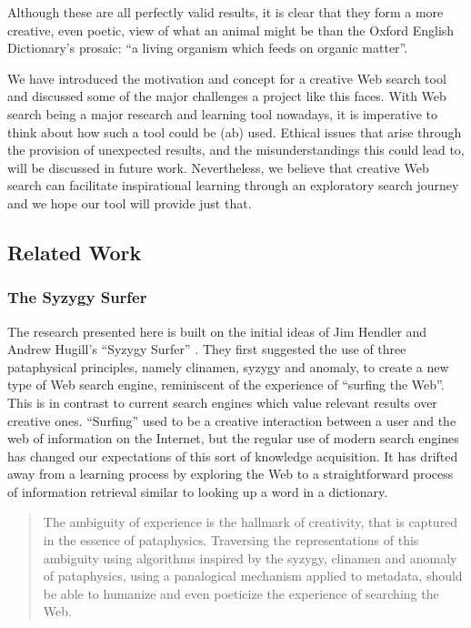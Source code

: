 Although these are all perfectly valid results, it is clear that they form a more creative, even poetic, view of what an animal might be than the Oxford English Dictionary's prosaic: ``a living organism which feeds on organic matter''.

We have introduced the motivation and concept for a creative Web search tool and discussed some of the major challenges a project like this faces. With Web search being a major research and learning tool nowadays, it is imperative to think about how such a tool could be (ab) used. Ethical issues that arise through the provision of unexpected results, and the misunderstandings this could lead to, will be discussed in future work. Nevertheless, we believe that creative Web search can facilitate inspirational learning through an exploratory search journey and we hope our tool will provide just that.


\subsection{Related Work}


\subsubsection*{The Syzygy Surfer}

The research presented here is built on the initial ideas of Jim Hendler and Andrew Hugill's ``Syzygy Surfer'' \autocite{Hendler2011, Hendler2013}. They first suggested the use of three pataphysical principles, namely clinamen, syzygy and anomaly, to create a new type of Web search engine, reminiscent of the experience of ``surfing the Web''. This is in contrast to current search engines which value relevant results over creative ones. ``Surfing'' used to be a creative interaction between a user and the web of information on the Internet, but the regular use of modern search engines has changed our expectations of this sort of knowledge acquisition. It has drifted away from a learning process by exploring the Web to a straightforward process of information retrieval similar to looking up a word in a dictionary.

\begin{quote}
  The ambiguity of experience is the hallmark of creativity, that is captured in the essence of pataphysics. Traversing the representations of this ambiguity using algorithms inspired by the syzygy, clinamen and anomaly of pataphysics, using a panalogical mechanism applied to metadata, should be able to humanize and even poeticize the experience of searching the Web.\autocite{Hendler2013}
\end{quote}

